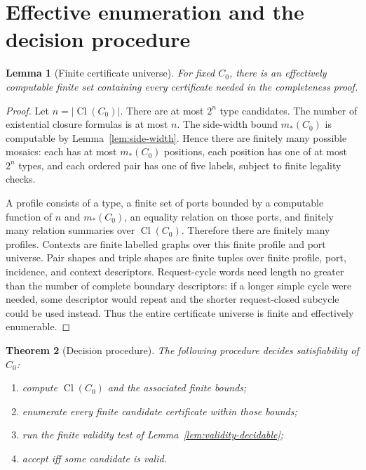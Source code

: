 \documentclass[11pt]{article}
\newtheorem{theorem}{Theorem}[section]
\newtheorem{lemma}[theorem]{Lemma}
\newcommand{\Cl}{\operatorname{Cl}}
\begin{document}
\section{Effective enumeration and the decision procedure}

\begin{lemma}[Finite certificate universe]\label{lem:finite-universe}
For fixed $C_0$, there is an effectively computable finite set containing every certificate needed in the completeness proof.
\end{lemma}

\begin{proof}
Let $n=|\Cl(C_0)|$.  There are at most $2^n$ type candidates.  The number of existential closure formulas is at most $n$.  The side-width bound $m_*(C_0)$ is computable by Lemma~\ref{lem:side-width}.  Hence there are finitely many possible mosaics: each has at most $m_*(C_0)$ positions, each position has one of at most $2^n$ types, and each ordered pair has one of five labels, subject to finite legality checks.

A profile consists of a type, a finite set of ports bounded by a computable function of $n$ and $m_*(C_0)$, an equality relation on those ports, and finitely many relation summaries over $\Cl(C_0)$.  Therefore there are finitely many profiles.  Contexts are finite labelled graphs over this finite profile and port universe.  Pair shapes and triple shapes are finite tuples over finite profile, port, incidence, and context descriptors.  Request-cycle words need length no greater than the number of complete boundary descriptors: if a longer simple cycle were needed, some descriptor would repeat and the shorter request-closed subcycle could be used instead.  Thus the entire certificate universe is finite and effectively enumerable.
\end{proof}

\begin{theorem}[Decision procedure]\label{thm:decision}
The following procedure decides satisfiability of $C_0$:
\begin{enumerate}[label=(D\arabic*)]
\item compute $\Cl(C_0)$ and the associated finite bounds;
\item enumerate every finite candidate certificate within those bounds;
\item run the finite validity test of Lemma~\ref{lem:validity-decidable};
\item accept iff some candidate is valid.
\end{enumerate}
\end{theorem}
\end{document}
